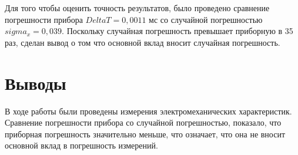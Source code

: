\documentclass[a4paper,14pt]{extarticle}
\begin{document}
Для того чтобы оценить точность результатов, было проведено сравнение погрешности прибора $Delta T = 0,0011$ мс со случайной погрешностью $sigma_{x} = 0,039$. Поскольку случайная погрешность превышает приборную в 35 раз, сделан вывод о том что основной вклад вносит случайная погрешность.

\section{Выводы}

В ходе работы были проведены измерения электромеханических характеристик. Сравнение погрешности прибора со случайной погрешностью, показало, что приборная погрешность значительно меньше, что означает, что она не вносит основной вклад в погрешность измерений. 
\end{document}
